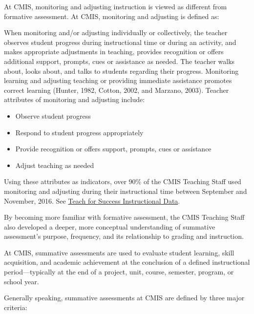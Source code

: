 \begin{findings}

At CMIS, monitoring and adjusting instruction is viewed as different from formative assessment. At CMIS, monitoring and adjusting is defined as:

When monitoring and/or adjusting individually or collectively, the teacher observes student progress during instructional time or during an activity, and makes appropriate adjustments in teaching, provides recognition or offers additional support, prompts, cues or assistance as needed. The teacher walks about, looks about, and talks to students regarding their progress. Monitoring learning and adjusting teaching or providing immediate assistance promotes correct learning (Hunter, 1982, Cotton, 2002, and Marzano, 2003). Teacher attributes of monitoring and adjusting include: 

\begin{itemize}
\item Observe student progress
\item Respond to student progress appropriately
\item Provide recognition or offers support, prompts, cues or assistance
\item Adjust teaching as needed
\end{itemize}

Using these attributes as indicators, over 90\% of the CMIS Teaching Staff used monitoring and adjusting during their instructional time between September and November, 2016. See \href{https://docs.google.com/a/cmis.ac.th/document/d/1cRvL50iIDvo8s1Gnxoczm82LhSVmEOvCrFksxzHD7ko/edit?usp=sharing}{Teach for Success Instructional Data}. 


By becoming more familiar with formative assessment, the CMIS Teaching Staff also developed a deeper, more conceptual understanding of summative assessment’s purpose, frequency, and its relationship to grading and instruction.

At CMIS, summative assessments are used to evaluate student learning, skill acquisition, and academic achievement at the conclusion of a defined instructional period—typically at the end of a project, unit, course, semester, program, or school year. 

Generally speaking, summative assessments at CMIS are defined by three major criteria:


\end{findings}
